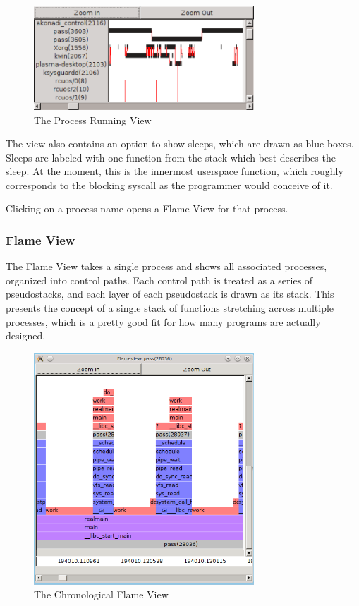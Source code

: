 \documentclass[10pt]{article}
\begin{document}
\begin{figure}[h]
\includegraphics[width=3.25in]{screenshot}
\caption{The Process Running View}
\end{figure}

The view also contains an option to show sleeps, which are drawn as blue boxes.  Sleeps are labeled with one function from the stack which best describes the sleep.  At the moment, this is the innermost userspace function, which roughly corresponds to the blocking syscall as the programmer would conceive of it.

Clicking on a process name opens a Flame View for that process.

\subsubsection{Flame View}

The Flame View takes a single process and shows all associated processes, organized into control paths.  Each control path is treated as a series of pseudostacks, and each layer of each pseudostack is drawn as its stack.  This presents the concept of a single stack of functions stretching across multiple processes, which is a pretty good fit for how many programs are actually designed.

\begin{figure}[h]
\includegraphics[width=3.25in]{flameshot}
\caption{The Chronological Flame View}
\end{figure}
\end{document}
